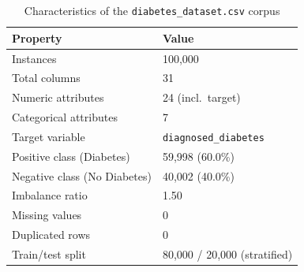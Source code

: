 \begin{table}[!t]
\renewcommand{\arraystretch}{1.2}
\caption{Characteristics of the \texttt{diabetes\_dataset.csv} corpus}
\label{tab:dataset}
\centering
\begin{tabular}{l l}
\toprule
\textbf{Property} & \textbf{Value} \\
\midrule
Instances & 100{,}000 \\
Total columns & 31 \\
Numeric attributes & 24 (incl.\ target) \\
Categorical attributes & 7 \\
Target variable & \texttt{diagnosed\_diabetes} \\
Positive class (Diabetes) & 59{,}998 (60.0\%) \\
Negative class (No Diabetes) & 40{,}002 (40.0\%) \\
Imbalance ratio & 1.50 \\
Missing values & 0 \\
Duplicated rows & 0 \\
Train/test split & 80{,}000 / 20{,}000 (stratified) \\
\bottomrule
\end{tabular}
\end{table}
